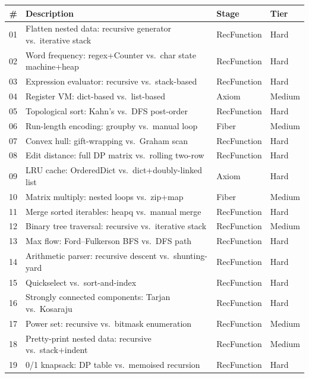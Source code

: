 \begin{center}
\small
\begin{tabular}{r p{5.5cm} l l}
  \textbf{\#} & \textbf{Description} & \textbf{Stage} & \textbf{Tier} \\
  \hline
  01 & Flatten nested data: recursive generator vs.\ iterative stack
     & RecFunction & Hard \\
  02 & Word frequency: regex+Counter vs.\ char state machine+heap
     & RecFunction & Hard \\
  03 & Expression evaluator: recursive vs.\ stack-based
     & RecFunction & Hard \\
  04 & Register VM: dict-based vs.\ list-based
     & Axiom & Medium \\
  05 & Topological sort: Kahn's vs.\ DFS post-order
     & RecFunction & Hard \\
  06 & Run-length encoding: groupby vs.\ manual loop
     & Fiber & Medium \\
  07 & Convex hull: gift-wrapping vs.\ Graham scan
     & RecFunction & Hard \\
  08 & Edit distance: full DP matrix vs.\ rolling two-row
     & RecFunction & Hard \\
  09 & LRU cache: OrderedDict vs.\ dict+doubly-linked list
     & Axiom & Hard \\
  10 & Matrix multiply: nested loops vs.\ zip+map
     & Fiber & Medium \\
  11 & Merge sorted iterables: heapq vs.\ manual merge
     & RecFunction & Hard \\
  12 & Binary tree traversal: recursive vs.\ iterative stack
     & RecFunction & Medium \\
  13 & Max flow: Ford--Fulkerson BFS vs.\ DFS path
     & RecFunction & Hard \\
  14 & Arithmetic parser: recursive descent vs.\ shunting-yard
     & RecFunction & Hard \\
  15 & Quickselect vs.\ sort-and-index
     & RecFunction & Hard \\
  16 & Strongly connected components: Tarjan vs.\ Kosaraju
     & RecFunction & Hard \\
  17 & Power set: recursive vs.\ bitmask enumeration
     & RecFunction & Medium \\
  18 & Pretty-print nested data: recursive vs.\ stack+indent
     & RecFunction & Medium \\
  19 & 0/1 knapsack: DP table vs.\ memoised recursion
     & RecFunction & Hard \\

\end{tabular}
\end{center}
